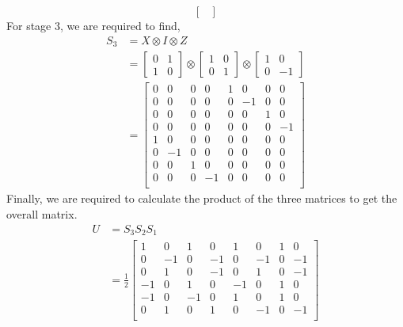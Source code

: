 \begin{example}
\begin{enumerate}
\[\begin{bmatrix}
            \end{bmatrix}
        \]
        For stage 3, we are required to find,
        \begin{align*}
            S_3 &= X \otimes I \otimes Z \\
            &= \begin{bmatrix} 0 & 1 \\ 1 & 0 \end{bmatrix} \otimes \begin{bmatrix} 1 & 0 \\ 0 & 1 \end{bmatrix} \otimes \begin{bmatrix} 1 & 0 \\ 0 & -1 \end{bmatrix} \\
            &= \begin{bmatrix} 0 & 0 & 0 & 0 & 1 & 0 & 0 & 0 \\
                0 & 0 & 0 & 0 & 0 & -1 & 0 & 0 \\
                0 & 0 & 0 & 0 & 0 & 0 & 1 & 0 \\
                0 & 0 & 0 & 0 & 0 & 0 & 0 & -1 \\
                1 & 0 & 0 & 0 & 0 & 0 & 0 & 0 \\
                0 & -1 & 0 & 0 & 0 & 0 & 0 & 0 \\
                0 & 0 & 1 & 0 & 0 & 0 & 0 & 0 \\
                0 & 0 & 0 & -1 & 0 & 0 & 0 & 0 \\
            \end{bmatrix} 
        \end{align*}
        Finally, we are required to calculate the product of the three matrices to get the overall matrix.
        \begin{align*} 
            U &= S_3S_2S_1 \\
            &= \frac{1}{2}\begin{bmatrix} 
                1 & 0 & 1 & 0 & 1 & 0 & 1 & 0 \\
                0 & -1 & 0 & -1 & 0 & -1 & 0 & -1 \\
                0 & 1 & 0 & -1 & 0 & 1 & 0 & -1 \\
                -1 & 0 & 1 & 0 & -1 & 0 & 1 & 0 \\
                -1 & 0 & -1 & 0 & 1 & 0 & 1 & 0 \\
                0 & 1 & 0 & 1 & 0 & -1 & 0 & -1 \\

\end{bmatrix}
\end{align*}
\end{enumerate}
\end{example}
